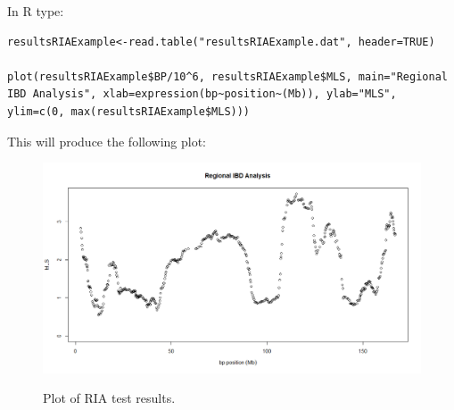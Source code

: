 \documentclass[a4paper,12pt]{article}
\begin{document}
In R type: 
\vspace{0.35cm} \begin{lstlisting}
resultsRIAExample<-read.table("resultsRIAExample.dat", header=TRUE)

plot(resultsRIAExample$BP/10^6, resultsRIAExample$MLS, main="Regional IBD Analysis", xlab=expression(bp~position~(Mb)), ylab="MLS", ylim=c(0, max(resultsRIAExample$MLS)))

\end{lstlisting} \vspace{0.35cm}
This will produce the following plot: 
{\begin{figure}[ht]
{\begin{center}
{\includegraphics[width=400pt]{exampleRIA.png}}
\caption{Plot of RIA test results.}
\label{example-fig}
\end{center}}
\end{figure}
}
\end{document}
